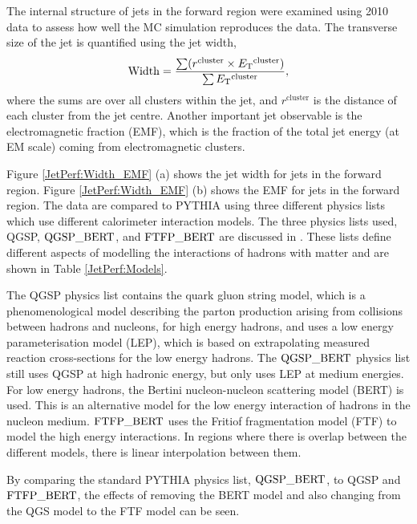 The internal structure of jets in the forward region were examined using 2010 data to assess how well the MC simulation reproduces the data.
The transverse size of the jet is quantified using the jet width,
\begin{equation}
\mathrm{Width}=\frac{\sum (r^{\mathrm{cluster}} \times \mbox{$E_{\rm T}$}{}^{\mathrm{cluster}}) }{\sum \mbox{$E_{\rm T}$}{}^{\mathrm{cluster}}},
\label{JetPerf:Width}
\end{equation}
where the sums are over all clusters within the jet, and $r^{\mathrm{cluster}}$ is the distance of each cluster from the jet centre.
Another important jet observable is the electromagnetic fraction (EMF), which is the fraction of the total jet energy (at EM scale) coming from electromagnetic clusters.


Figure \ref{JetPerf:Width_EMF} (a) shows the jet width for jets in the forward region.
Figure \ref{JetPerf:Width_EMF} (b) shows the EMF for jets in the forward region.
The data are compared to PYTHIA using three different physics lists which use different calorimeter interaction models.
The three physics lists used, QGSP, $\rm QGSP\_BERT$, and $\rm FTFP\_BERT$ are discussed in \cite{ref:HadModels}. 
These lists define different aspects of modelling the interactions of hadrons with matter and are shown in Table \ref{JetPerf:Models}.

The QGSP \cite{ref:QGSPNew} physics list contains the quark gluon string model, which is a phenomenological model describing the parton production arising from collisions between hadrons and nucleons, for high energy hadrons, and uses a low energy parameterisation model (LEP), which is based on extrapolating measured reaction cross-sections for the low energy hadrons.  
The $\rm{QGSP\_BERT}$ physics list still uses QGSP at high hadronic energy, but only uses LEP at medium energies.
For low energy hadrons, the Bertini nucleon-nucleon scattering model (BERT) \cite{ref:BERTNew} is used. This is an alternative model for the low energy interaction of hadrons in  the nucleon medium.
$\rm{FTFP\_BERT}$ uses the  Fritiof fragmentation model (FTF) \cite{ref:FTFNew} to model the high energy interactions. 
In regions where there is overlap between the different models, there is linear interpolation between them.


By comparing the standard PYTHIA physics list, $\rm QGSP\_BERT$, to QGSP and $\rm FTFP\_BERT$, the effects of removing the BERT model and also changing from the QGS model to the FTF model can be seen.

